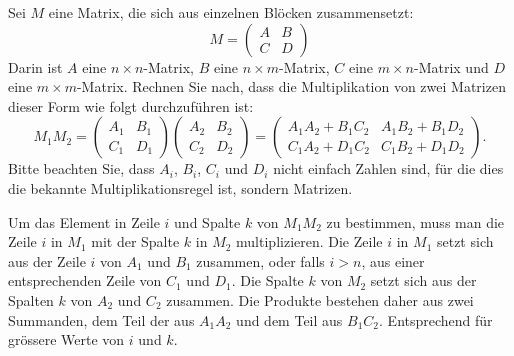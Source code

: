 Sei $M$ eine Matrix, die sich aus einzelnen Blöcken zusammensetzt:
\[
M
=
\begin{pmatrix}
A&B\\
C&D
\end{pmatrix}
\]
Darin ist $A$ eine $n\times n$-Matrix, $B$ eine $n\times m$-Matrix,
$C$ eine $m\times n$-Matrix und $D$ eine $m\times m$-Matrix. Rechnen
Sie nach, dass die Multiplikation von zwei Matrizen dieser Form
wie folgt durchzuführen ist:
\[
M_1M_2=
\begin{pmatrix}
A_1&B_1\\
C_1&D_1
\end{pmatrix}
\begin{pmatrix}
A_2&B_2\\
C_2&D_2
\end{pmatrix}
=\begin{pmatrix}
A_1A_2+B_1C_2&A_1B_2+B_1D_2\\
C_1A_2+D_1C_2&C_1B_2+D_1D_2
\end{pmatrix}.
\]
Bitte beachten Sie, dass $A_i$, $B_i$, $C_i$ und $D_i$  nicht einfach
Zahlen sind, für die dies die bekannte Multiplikationsregel ist,
sondern Matrizen.

\begin{loesung}
Um das Element in Zeile $i$ und Spalte $k$ von $M_1M_2$ zu bestimmen,
muss man die Zeile $i$ in $M_1$ mit der Spalte $k$ in $M_2$ multiplizieren.
Die Zeile $i$ in $M_1$ setzt sich aus der Zeile $i$ von $A_1$ und $B_1$
zusammen, oder falls $i > n$, aus einer entsprechenden Zeile von
$C_1$ und $D_1$.
Die Spalte $k$ von $M_2$ setzt sich aus der Spalten $k$ von
$A_2$ und $C_2$ zusammen.
Die Produkte bestehen daher aus zwei Summanden, dem Teil
der aus $A_1A_2$
und dem Teil aus $B_1C_2$. Entsprechend für grössere Werte von $i$
und $k$.
\end{loesung}

